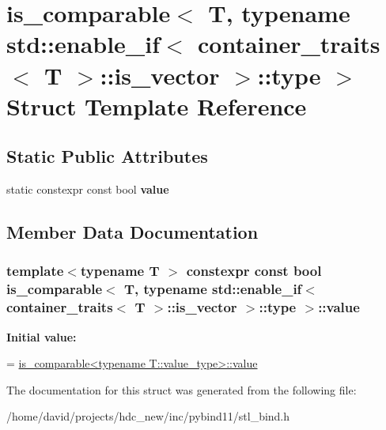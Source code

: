 \hypertarget{structis__comparable_3_01_t_00_01typename_01std_1_1enable__if_3_01container__traits_3_01_t_01_4_1_1is__vector_01_4_1_1type_01_4}{}\section{is\+\_\+comparable$<$ T, typename std\+:\+:enable\+\_\+if$<$ container\+\_\+traits$<$ T $>$\+:\+:is\+\_\+vector $>$\+:\+:type $>$ Struct Template Reference}
\label{structis__comparable_3_01_t_00_01typename_01std_1_1enable__if_3_01container__traits_3_01_t_01_4_1_1is__vector_01_4_1_1type_01_4}
\subsection*{Static Public Attributes}
\begin{DoxyCompactItemize}
\item 
static constexpr const bool {\bfseries value}
\end{DoxyCompactItemize}


\subsection{Member Data Documentation}
\subsubsection[{\texorpdfstring{value}{value}}]{\setlength{\rightskip}{0pt plus 5cm}template$<$typename T $>$ constexpr const bool {\bf is\+\_\+comparable}$<$ T, typename std\+::enable\+\_\+if$<$ {\bf container\+\_\+traits}$<$ T $>$\+::is\+\_\+vector $>$\+::type $>$\+::value\hspace{0.3cm}{\ttfamily [static]}}\hypertarget{structis__comparable_3_01_t_00_01typename_01std_1_1enable__if_3_01container__traits_3_01_t_01_4_1_1is__vector_01_4_1_1type_01_4_a391fc78a228d5d3abd821185951492d0}{}\label{structis__comparable_3_01_t_00_01typename_01std_1_1enable__if_3_01container__traits_3_01_t_01_4_1_1is__vector_01_4_1_1type_01_4_a391fc78a228d5d3abd821185951492d0}
{\bfseries Initial value\+:}
\begin{DoxyCode}
=
        \hyperlink{structis__comparable}{is\_comparable<typename T::value\_type>::value}
\end{DoxyCode}


The documentation for this struct was generated from the following file\+:\begin{DoxyCompactItemize}
\item 
/home/david/projects/hdc\+\_\+new/inc/pybind11/stl\+\_\+bind.\+h\end{DoxyCompactItemize}
